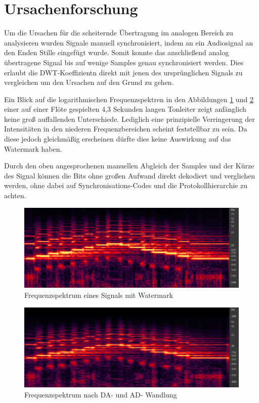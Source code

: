 \section{Ursachenforschung}

Um die Ursachen für die scheiternde Übertragung im analogen Bereich zu analysieren wurden Signale manuell synchronisiert, indem an ein Audiosignal an den Enden Stille eingefügt wurde. Somit konnte das anschließend analog übertragene Signal bis auf wenige Samples genau synchronisiert werden. Dies erlaubt die DWT-Koeffizientn direkt mit jenen des ursprünglichen Signals zu vergleichen um den Ursachen auf den Grund zu gehen. 

Ein Blick auf die logarithmischen Frequenzspektren in den Abbildungen \ref{fig:spektrum-original} und \ref{fig:spektrum-soundkarte} einer auf einer Flöte gespielten 4,3 Sekunden langen Tonleiter zeigt anfänglich keine groß auffallenden Unterschiede. Lediglich eine prinzipielle Verringerung der Intensitäten in den niederen Frequenzbereichen scheint feststellbar zu sein. Da diese jedoch gleichmäßig erscheinen dürfte dies keine Auswirkung auf das Watermark haben. 

Durch den oben angesprochenen manuellen Abgleich der Samples und der Kürze des Signal können die Bits ohne großen Aufwand direkt dekodiert und verglichen werden, ohne dabei auf Synchronisations-Codes und die Protokollhierarchie zu achten.

\newpage

\begin{figure}[h]
	\centering
	\includegraphics[width=\textwidth]{figures/spektrum-original.png}
	\caption{Frequenzspektrum eines Signals mit Watermark}
	\label{fig:spektrum-original}
\end{figure}

\begin{figure}[h]
	\centering
	\includegraphics[width=\textwidth]{figures/spektrum-soundkarte.png}
	\caption{Frequenzspektrum nach DA- und AD- Wandlung}
	\label{fig:spektrum-soundkarte}
\end{figure}

